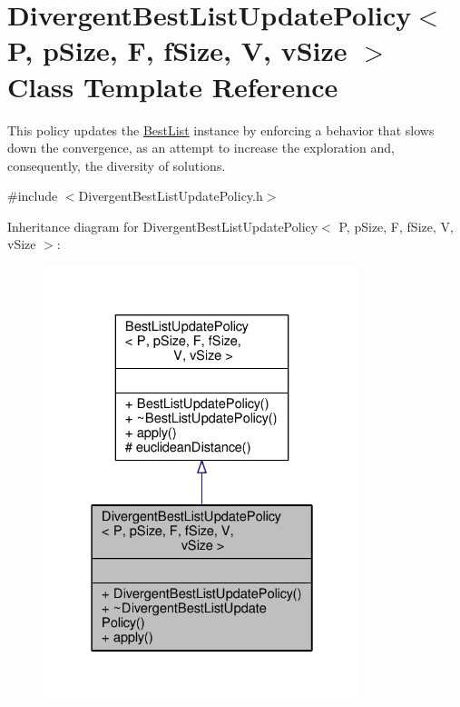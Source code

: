 \hypertarget{classDivergentBestListUpdatePolicy}{}\section{Divergent\+Best\+List\+Update\+Policy$<$ P, p\+Size, F, f\+Size, V, v\+Size $>$ Class Template Reference}
\label{classDivergentBestListUpdatePolicy}


This policy updates the \hyperlink{classBestList}{Best\+List} instance by enforcing a behavior that slows down the convergence, as an attempt to increase the exploration and, consequently, the diversity of solutions.  




{\ttfamily \#include $<$Divergent\+Best\+List\+Update\+Policy.\+h$>$}



Inheritance diagram for Divergent\+Best\+List\+Update\+Policy$<$ P, p\+Size, F, f\+Size, V, v\+Size $>$\+:
\nopagebreak
\begin{figure}[H]
\begin{center}
\leavevmode
\includegraphics[width=262pt]{classDivergentBestListUpdatePolicy__inherit__graph}
\end{center}
\end{figure}


